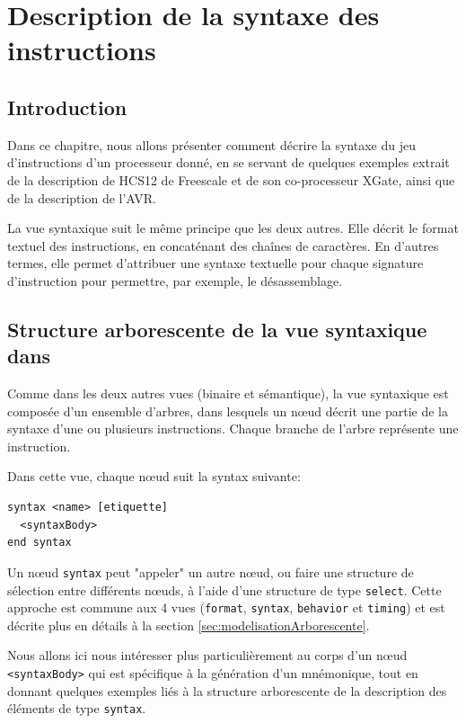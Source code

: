 \chapter{Description de la syntaxe des instructions}
\label{chap:syntax}
\section{Introduction}
Dans ce chapitre, nous allons présenter comment décrire la syntaxe du jeu d'instructions d'un processeur donné, en se servant de quelques exemples extrait de la description de HCS12 de Freescale et de son co-processeur XGate, ainsi que de la description de l'AVR.

La vue syntaxique suit le même principe que les deux autres. Elle décrit le format textuel des instructions, en concaténant des chaînes de caractères. En d'autres termes, elle permet d'attribuer une syntaxe textuelle pour chaque signature d'instruction pour permettre, par exemple, le désassemblage. 

\section {Structure arborescente de la vue syntaxique dans \harmless}
Comme dans les deux autres vues (binaire et sémantique), la vue syntaxique est composée d'un ensemble d'arbres, dans lesquels un nœud décrit une partie de la syntaxe d'une ou plusieurs instructions. Chaque branche de l'arbre représente une instruction.

Dans cette vue, chaque nœud suit la syntax suivante:

\begin{lstlisting}
syntax <name> [etiquette]
  <syntaxBody>
end syntax
\end{lstlisting}

Un nœud \texttt{syntax} peut "appeler" un autre nœud, ou faire une structure de sélection entre différents nœuds, à l'aide d'une structure de type \texttt{select}. Cette approche est commune aux 4 vues (\texttt{format}, \texttt{syntax}, \texttt{behavior} et \texttt{timing}) et est décrite plus en détails à la section \ref{sec:modelisationArborescente}.

Nous allons ici nous intéresser plus particulièrement au corps d'un nœud \texttt{<syntaxBody>} qui est spécifique à la génération d'un mnémonique, tout en donnant quelques exemples liés à la structure arborescente de la description des éléments de type \texttt{syntax}.

